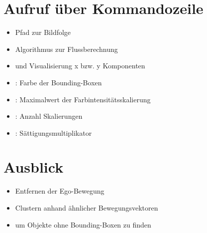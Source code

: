 \documentclass[10pt]{beamer}
\begin{document}
\section{Aufruf über Kommandozeile}
\begin{frame}{\secname}


\begin{itemize}
\item {} Pfad zur Bildfolge
\item {} Algorithmus zur Flussberechnung
  \item {} und  Visualisierung x bzw. y Komponenten

\item{}: Farbe der Bounding-Boxen

\item{}: Maximalwert der Farbintensitätsskalierung

\item{}: Anzahl Skalierungen

\item{}: Sättigungsmultiplikator
\end{itemize}

\end{frame}

\section{Ausblick}
\begin{frame}{\secname}
\begin{itemize}
	\item Entfernen der Ego-Bewegung
	\item Clustern anhand ähnlicher Bewegungsvektoren
	\item um Objekte ohne Bounding-Boxen zu finden
\end{itemize}
\end{frame}





%  
%  

\end{document}
